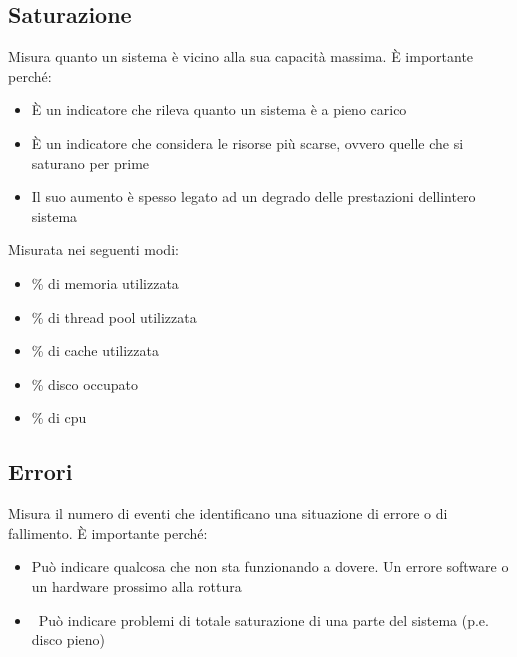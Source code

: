 \documentclass[
]{article}
\providecommand{\tightlist}{%
  \setlength{\itemsep}{0pt}\setlength{\parskip}{0pt}}
\begin{document}
{}

\subsection{\texorpdfstring{{Saturazione}}{Saturazione}}\label{h.9gxcupioe1ks}

{Misura quanto un sistema è vicino alla sua capacità massima. È
importante perché: }

\begin{itemize}
\tightlist
\item
  {È un indicatore che rileva quanto un sistema è a pieno carico }
\item
  {È un indicatore che considera le risorse più scarse, ovvero quelle
  che si saturano per prime }
\item
  {Il suo aumento è spesso legato ad un degrado delle prestazioni
  dell\textquotesingle intero sistema}
\end{itemize}

{}

{Misurata nei seguenti modi:}

\begin{itemize}
\tightlist
\item
  {\% di memoria utilizzata}
\item
  {\% di thread pool utilizzata }
\item
  {\% di cache utilizzata }
\item
  {\% disco occupato }
\item
  {\% di cpu}
\end{itemize}

{}

\subsection{\texorpdfstring{{Errori}}{Errori}}\label{h.ixgb9zygblda}

{Misura il numero di eventi che identificano una situazione di errore o
di fallimento. È importante perché: }

\begin{itemize}
\tightlist
\item
  {Può indicare qualcosa che non sta funzionando a dovere. Un errore
  software o un hardware prossimo alla rottura}
\item
  {~Può indicare problemi di totale saturazione di una parte del sistema
  (p.e. disco pieno)}
\end{itemize}

{}
\end{document}
